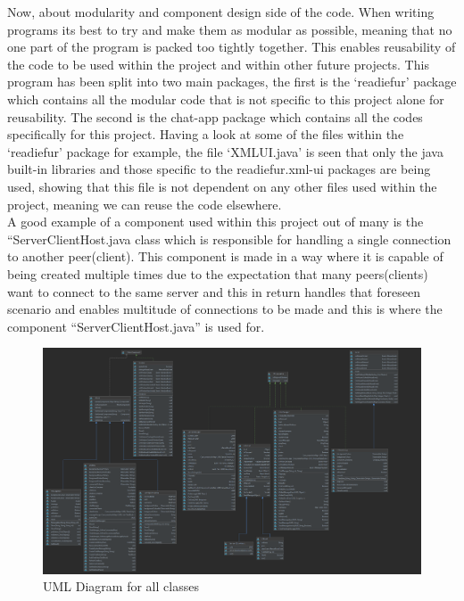 \documentclass{COMPXXXX}
\begin{document}
\normalsize \textrm {Now, about modularity and component design side of the code. When writing programs its best to try and make them as modular as possible, meaning that no one part of the program is packed too tightly together. This enables reusability of the code to be used within the project and within other future projects. This program has been split into two main packages, the first is the ‘readiefur’ package which contains all the modular code that is not specific to this project alone for reusability. The second is the chat-app package which contains all the codes specifically for this project. Having a look at some of the files within the ‘readiefur’ package for example, the file ‘XMLUI.java’ is seen that only the java built-in libraries and those specific to the readiefur.xml-ui packages are being used, showing that this file is not dependent on any other files used within the project, meaning we can reuse the code elsewhere.\\
A good example of a component used within this project out of many is the “ServerClientHost.java class which is responsible for handling a single connection to another peer(client). This component is made in a way where it is capable of being created multiple times due to the expectation that many peers(clients) want to connect to the same server and this in return handles that foreseen scenario and enables multitude of connections to be made and this is where the component “ServerClientHost.java” is used for.}\\
\begin{figure}
\centering
\includegraphics[width=1.0\linewidth]{All UML.png}
\caption{UML Diagram for all classes}
\label{fig:figure02}
\end{figure}
\end{document}
